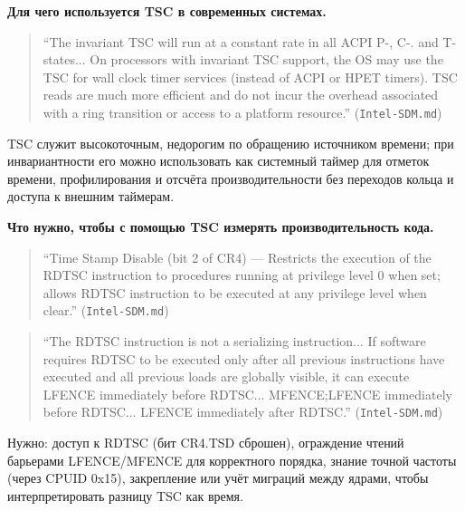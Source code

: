 \documentclass[a4paper,12pt]{article}
\begin{document}
\textbf{Для чего используется TSC в современных системах.} 
\begin{quote}
``The invariant TSC will run at a constant rate in all ACPI P-, C-. and T-states... On processors with invariant TSC support, the OS may use the TSC for wall clock timer services (instead of ACPI or HPET timers). TSC reads are much more efficient and do not incur the overhead associated with a ring transition or access to a platform resource.'' (\texttt{Intel-SDM.md})
\end{quote}
TSC служит высокоточным, недорогим по обращению источником времени; при инвариантности его можно использовать как системный таймер для отметок времени, профилирования и отсчёта производительности без переходов кольца и доступа к внешним таймерам.

\textbf{Что нужно, чтобы с помощью TSC измерять производительность кода.} 
\begin{quote}
``Time Stamp Disable (bit 2 of CR4) — Restricts the execution of the RDTSC instruction to procedures running at privilege level 0 when set; allows RDTSC instruction to be executed at any privilege level when clear.'' (\texttt{Intel-SDM.md})
\end{quote}
\begin{quote}
``The RDTSC instruction is not a serializing instruction... If software requires RDTSC to be executed only after all previous instructions have executed and all previous loads are globally visible, it can execute LFENCE immediately before RDTSC... MFENCE;LFENCE immediately before RDTSC... LFENCE immediately after RDTSC.'' (\texttt{Intel-SDM.md})
\end{quote}
Нужно: доступ к RDTSC (бит CR4.TSD сброшен), ограждение чтений барьерами LFENCE/MFENCE для корректного порядка, знание точной частоты (через CPUID 0x15), закрепление или учёт миграций между ядрами, чтобы интерпретировать разницу TSC как время.
\end{document}
